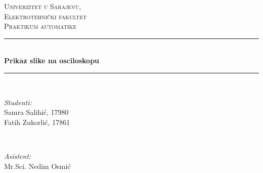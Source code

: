 \documentclass[12pt]{article}
\begin{document}

	            
\begin{titlepage}

\newcommand{\HRule}{\rule{\linewidth}{0.5mm}} %

\center %
 

\textsc{\Large Univerzitet u Sarajevu, \\ Elektrotehnički fakultet}\\[3.5cm] %

\textsc{\large Praktikum automatike}\\[0.5cm] %


\HRule \\[0.4cm]
{ \huge \bfseries Prikaz slike na osciloskopu}\\[0.4cm] %
\HRule \\[1.5cm]
 

\begin{minipage}{0.4\textwidth}
\begin{flushleft} \large
\emph{Studenti:}\\
Samra Salihić, 17980\\
Fatih Zukorlić, 17861\\
\end{flushleft}
\end{minipage}
~
\begin{minipage}{0.4\textwidth}
\begin{flushright} \large
\emph{Asistent:} \\
Mr.Sci. Nedim Osmić
\end{flushright}
\end{minipage}\\[2cm]


\end{titlepage}
\end{document}
